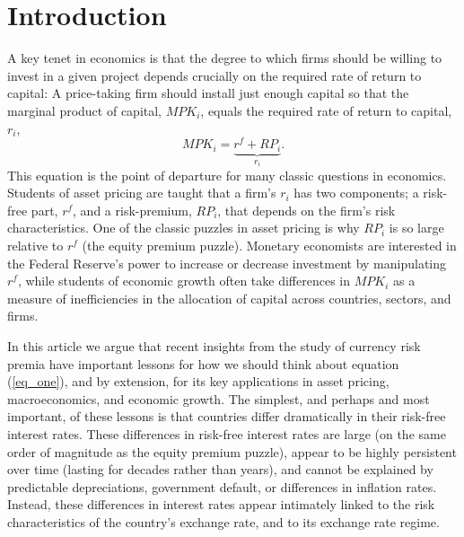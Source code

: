 \section{Introduction}


A key tenet in economics is that the degree to which firms should be
willing to invest in a given project depends crucially on the required
rate of return to capital: A price-taking firm should install just
enough capital so that the marginal product of capital, $MPK_i$,
equals the required rate of return to capital,$r_i$,
\begin{equation}
  MPK_i=\underbrace{r^f+RP_i}_{r_i}.
  \label{eq_one}
\end{equation} 
This equation is the point of departure for many classic questions in
economics. Students of asset pricing are taught that a firm's $r_i$
has two components; a risk-free part, $r^f$, and a risk-premium,
$RP_i$, that depends on the firm's risk characteristics. One of the
classic puzzles in asset pricing is why $RP_i$ is so large relative to
$r^f$ (the equity premium puzzle). Monetary economists are interested
in the Federal Reserve's power to increase or decrease investment by
manipulating $r^f$, while students of economic growth often take
differences in $MPK_i$ as a measure of inefficiencies in the
allocation of capital across countries, sectors, and firms.

In this article we argue that recent insights from the study of
currency risk premia have important lessons for how we should think
about equation (\ref{eq_one}), and by extension, for its key
applications in asset pricing, macroeconomics, and economic growth.
The simplest, and perhaps and most important, of these lessons is that
countries differ dramatically in their risk-free interest rates. These
differences in risk-free interest rates are large (on the same order
of magnitude as the equity premium puzzle), appear to be highly
persistent over time (lasting for decades rather than years), and
cannot be explained by predictable depreciations, government default,
or differences in inflation rates. Instead, these differences in
interest rates appear intimately linked to the risk characteristics of
the country's exchange rate, and to its exchange rate regime.

